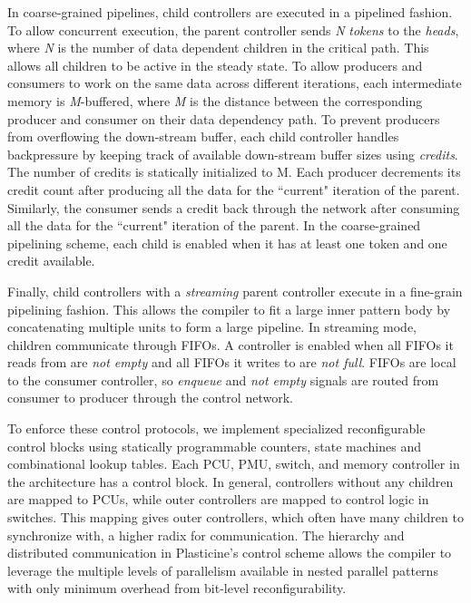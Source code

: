 In coarse-grained pipelines, child controllers 
are executed in a pipelined fashion. To allow concurrent execution, the parent controller sends \emph{N} \emph{tokens}
to the \emph{heads}, where \emph{N} is the number of data dependent children in the critical path. This
allows all children to be active in the steady state. To allow producers and consumers to work on
the same data across different iterations, each intermediate memory is \emph{M}-buffered, where \emph{M} is the
distance between the corresponding producer and consumer on their data dependency path. To prevent producers from
overflowing the down-stream buffer, each child controller handles backpressure by keeping
track of available down-stream buffer sizes using \emph{credits}.
The number of credits is statically initialized to M. Each producer decrements its credit count after producing
all the data for the ``current" iteration of the parent. Similarly, the consumer sends a credit back through the
network after consuming all the data for the ``current" iteration of the parent. 
In the coarse-grained pipelining scheme, each child is enabled when it has at least one token and one credit
available. 

Finally, child controllers with a \emph{streaming} parent controller
execute in a fine-grain pipelining fashion. This allows the compiler to fit a large inner pattern body by
concatenating multiple units to form a large pipeline. In streaming mode, children communicate
through FIFOs. A controller is enabled when all FIFOs it reads from are \emph{not
empty} and
all FIFOs it writes to are \emph{not full}. FIFOs are local to the consumer controller, so 
\emph{enqueue} and \emph{not empty} signals are routed from consumer to producer through the control network. 

To enforce these control protocols, we implement specialized reconfigurable control blocks using statically programmable counters,
state machines and combinational lookup tables. Each PCU, PMU, switch, and memory controller in the architecture has a control block. 
In general, controllers without any children are mapped to PCUs, while outer controllers are mapped to control logic in switches.
This mapping gives outer controllers, which often have many children to synchronize with, a higher radix for
communication. The hierarchy and distributed communication in Plasticine's control scheme allows the
compiler to leverage the multiple levels of parallelism available in nested parallel patterns with only minimum overhead from bit-level 
reconfigurability. 

